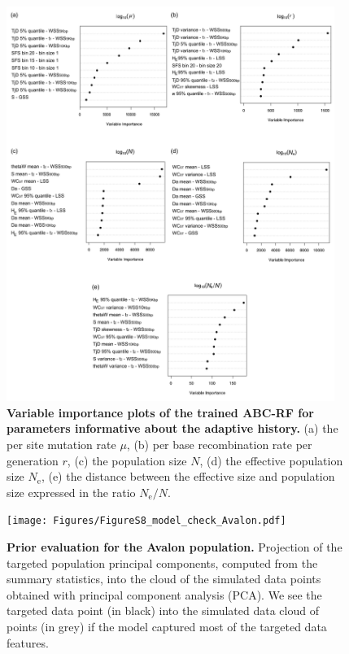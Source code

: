 \documentclass[a4paper, 12pt]{article}
\begin{document}
\begin{figure}[ht]
  \centering
  \includegraphics[width=0.95\textwidth]{Figures/FigureS7_varplot_demography.pdf}
  \small\caption{\textbf{Variable importance plots of the trained ABC-RF for parameters informative about the adaptive history.} (a) the per site mutation rate $\mu$, (b) per base recombination rate per generation $r$, (c) the population size $N$, (d) the effective population size $N_{\mathrm{e}}$, (e) the distance between the effective size and population size expressed in the ratio $N_{\mathrm{e}}/N$.}
  \label{fig:supple_pods_varplots_demo}
\end{figure}

\begin{figure}[ht]
  \centering
  \texttt{[image: Figures/FigureS8\_model\_check\_Avalon.pdf]}
  \small\caption{\textbf{Prior evaluation for the Avalon population.} Projection of the targeted population principal components, computed from the summary statistics, into the cloud of the simulated data points obtained with principal component analysis (PCA). We see the targeted data point (in black) into the simulated data cloud of points (in grey) if the model captured most of the targeted data features.}
  \label{fig:supple_model_check_avalon}
\end{figure}
\end{document}
